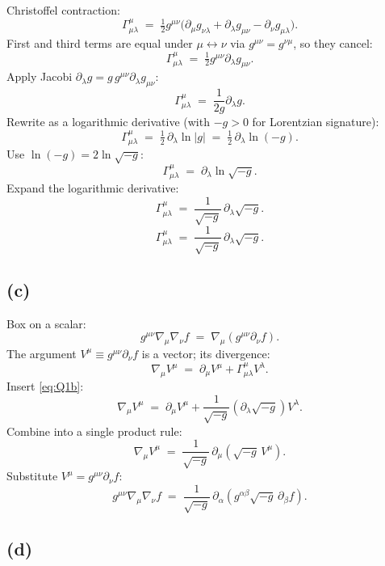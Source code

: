 \documentclass[11pt]{article}
\begin{document}
Christoffel contraction:
\[
\Gamma^\mu_{\mu\lambda} \;=\; \tfrac12 g^{\mu\nu}\bigl(\partial_\mu g_{\nu\lambda}+\partial_\lambda g_{\mu\nu}-\partial_\nu g_{\mu\lambda}\bigr).
\]
First and third terms are equal under $\mu\leftrightarrow\nu$ via $g^{\mu\nu}=g^{\nu\mu}$, so they cancel:
\[
\Gamma^\mu_{\mu\lambda} \;=\; \tfrac12 g^{\mu\nu}\partial_\lambda g_{\mu\nu}.
\]
Apply Jacobi $\partial_\lambda g=g\,g^{\mu\nu}\partial_\lambda g_{\mu\nu}$:
\[
\Gamma^\mu_{\mu\lambda} \;=\; \frac{1}{2g}\partial_\lambda g.
\]
Rewrite as a logarithmic derivative (with $-g>0$ for Lorentzian signature):
\[
\Gamma^\mu_{\mu\lambda} \;=\; \tfrac12\,\partial_\lambda\ln|g| \;=\; \tfrac12\,\partial_\lambda\ln(-g).
\]
Use $\ln(-g)=2\ln\sqrt{-g}$:
\[
\Gamma^\mu_{\mu\lambda} \;=\; \partial_\lambda\ln\sqrt{-g}.
\]
Expand the logarithmic derivative:
\[
\Gamma^\mu_{\mu\lambda} \;=\; \frac{1}{\sqrt{-g}}\,\partial_\lambda\sqrt{-g}.
\]
\begin{equation}
\boxed{\;\Gamma^\mu_{\mu\lambda} \;=\; \frac{1}{\sqrt{-g}}\,\partial_\lambda\sqrt{-g}.\;}
\label{eq:Q1b}
\end{equation}

\subsection*{(c)}

Box on a scalar:
\[
g^{\mu\nu}\nabla_\mu\nabla_\nu f \;=\; \nabla_\mu(g^{\mu\nu}\partial_\nu f).
\]
The argument $V^\mu\equiv g^{\mu\nu}\partial_\nu f$ is a vector; its divergence:
\[
\nabla_\mu V^\mu \;=\; \partial_\mu V^\mu + \Gamma^\mu_{\mu\lambda}V^\lambda.
\]
Insert \eqref{eq:Q1b}:
\[
\nabla_\mu V^\mu \;=\; \partial_\mu V^\mu + \frac{1}{\sqrt{-g}}(\partial_\lambda\sqrt{-g})V^\lambda.
\]
Combine into a single product rule:
\[
\nabla_\mu V^\mu \;=\; \frac{1}{\sqrt{-g}}\,\partial_\mu(\sqrt{-g}\,V^\mu).
\]
Substitute $V^\mu=g^{\mu\nu}\partial_\nu f$:
\begin{equation}
\boxed{\;g^{\mu\nu}\nabla_\mu\nabla_\nu f \;=\; \frac{1}{\sqrt{-g}}\,\partial_\alpha\!\left(g^{\alpha\beta}\sqrt{-g}\,\partial_\beta f\right).\;}
\label{eq:Q1c}
\end{equation}

\subsection*{(d)}
\end{document}
